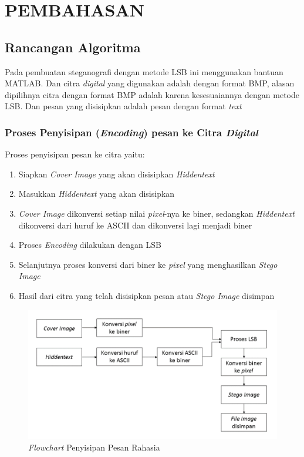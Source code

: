 
\chapter{PEMBAHASAN}

\section{Rancangan Algoritma}
Pada pembuatan steganografi dengan metode LSB ini menggunakan bantuan MATLAB. Dan citra \emph{digital} yang digunakan adalah dengan format BMP, alasan dipilihnya citra dengan format BMP adalah karena kesesuaiannya dengan metode LSB. Dan pesan yang disisipkan adalah pesan dengan format \emph{text}

	\subsection{Proses Penyisipan (\emph{Encoding}) pesan ke Citra \emph{Digital}}
	Proses penyisipan pesan ke citra yaitu:
	\begin{enumerate}
		\item Siapkan \emph{Cover Image} yang akan disisipkan \emph{Hiddentext}
		\item Masukkan \emph{Hiddentext} yang akan disisipkan
		\item \emph{Cover Image} dikonversi setiap nilai \emph{pixel}-nya ke biner, sedangkan \emph{Hiddentext} dikonversi dari huruf ke ASCII dan dikonversi lagi menjadi biner
		\item Proses \emph{Encoding} dilakukan dengan LSB
		\item Selanjutnya proses konversi dari biner ke \emph{pixel} yang menghasilkan \emph{Stego Image}
		\item Hasil dari citra yang telah disisipkan pesan atau \emph{Stego Image} disimpan
	\end{enumerate}
	
	\begin{figure}[H]
		\centering
		\includegraphics[width=1\textwidth]{gambar/penyisipan2}
		\caption{\emph{Flowchart} Penyisipan Pesan Rahasia}
		\label{flowchart_penyisipan}
	\end{figure}
	
